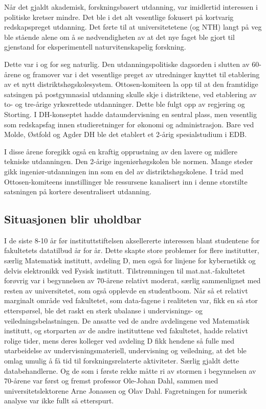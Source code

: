 \documentclass[../main.tex]{subfiles}
\begin{document}
Når det gjaldt akademisk, forskningsbasert utdanning, var imidlertid interessen i politiske kretser mindre. Det ble i det alt vesentlige fokusert på kortvarig redskapspreget utdanning. Det førte til at universitetetene (og NTH) langt på veg ble stående alene om å se nødvendigheten av at det nye faget ble gjort til gjenstand for eksperimentell naturvitenskapelig forskning.

Dette var i og for seg naturlig. Den utdanningspolitiske dagsorden i slutten av 60-årene og framover var i det vesentlige preget av utredninger knyttet til etablering av et nytt distriktshøgskolesystem. Ottosen-komiteen la opp til at den framtidige satsingen på postgymnasial utdanning skulle skje i distriktene, ved etablering av to- og tre-årige yrkesrettede utdanninger. Dette ble fulgt opp av regjering og Storting. I DH-konseptet hadde dataundervisning en sentral plass, men vesentlig som redskapsfag innen studieretninger for økonomi og administrasjon. Bare ved Molde, Østfold og Agder DH ble det etablert et 2-årig spesialstudium i EDB. 

I disse årene foregikk også en kraftig opprustning av den lavere og midlere tekniske utdanningen. Den 2-årige ingeniørhøgskolen ble normen. Mange steder gikk ingeniør-utdanningen inn som en del av distriktshøgskolene. I tråd med Ottosen-komiteens innstillinger ble ressursene kanalisert inn i denne storstilte satsningen på kortere desentralisert utdanning.

\subsection{Situasjonen blir uholdbar}
I de siste 8-10 år før instituttstiftelsen aksellererte interessen blant studentene for fakultetets datatilbud år for år. Dette skapte store problemer for flere institutter, særlig Matematisk institutt, avdeling D, men også for linjene for kybernetikk og delvis elektronikk ved Fysisk institutt. Tilstrømningen til mat.nat.-fakultetet forøvrig var i begynnelsen av 70-årene relativt moderat, særlig sammenlignet med resten av universitetet, som også opplevde en studentboom. Når så et relativt marginalt område ved fakultetet, som data-fagene i realiteten var, fikk en så stor etterspørsel, ble det raskt en sterk ubalanse i undervisnings- og veiledningsbelastningen. De ansatte ved de andre avdelingene ved Matematisk institutt, og storparten av de andre instituttene ved fakultetet, hadde relativt rolige tider, mens deres kolleger ved avdeling D fikk hendene så fulle med utarbeidelse av undervisningsmateriell, undervisning og veiledning, at det ble omlag umulig å få tid til forskningsrelaterte aktiviteter. Særlig gjaldt dette databehandlerne. Og de som i første rekke måtte ri av stormen i begynnelsen av 70-årene var først og fremst professor Ole-Johan Dahl, sammen med universitetslektorene Arne Jonassen og Olav Dahl. Fagretningen for numerisk analyse var ikke fullt så etterspurt.
\end{document}

